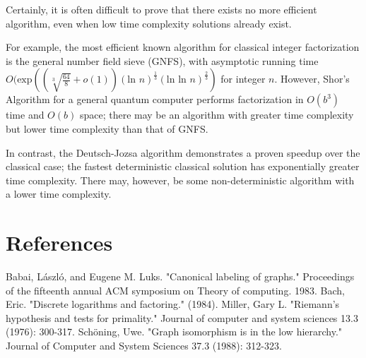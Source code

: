 \documentclass{article}
\begin{document}
Certainly, it is often difficult to prove that there exists no more efficient algorithm, even when low time complexity solutions already exist.

For example, the most efficient known algorithm for classical integer factorization is the general number field sieve (GNFS), with asymptotic running time\newline $O(\text{exp}\left(\left(\sqrt[3]{\frac{64}{8}}+o(1)\right)(\text{ln }n)^\frac{1}{3}(\text{ln ln }n)^\frac{2}{3}\right)$ for integer $n$. However, Shor's Algorithm for a general quantum computer performs factorization in $O(b^3)$ time and $O(b)$ space; there may be an algorithm with greater time complexity but lower time complexity than that of GNFS.

In contrast, the Deutsch-Jozsa algorithm demonstrates a proven speedup over the classical case; the fastest deterministic classical solution has exponentially greater time complexity. There may, however, be some non-deterministic algorithm with a lower time complexity.

\newpage
\section*{References}
Babai, László, and Eugene M. Luks. "Canonical labeling of graphs." Proceedings of the fifteenth annual ACM symposium on Theory of computing. 1983.\newline
Bach, Eric. "Discrete logarithms and factoring." (1984).\newline
Miller, Gary L. "Riemann's hypothesis and tests for primality." Journal of computer and system sciences 13.3 (1976): 300-317.\newline
Schöning, Uwe. "Graph isomorphism is in the low hierarchy." Journal of Computer and System Sciences 37.3 (1988): 312-323.\newline
\end{document}
